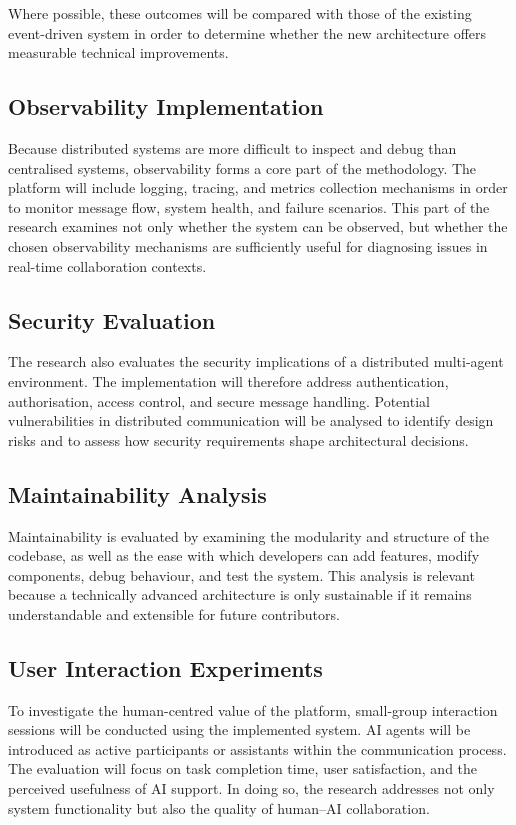 \documentclass[11pt]{article}
\begin{document}
Where possible, these outcomes will be compared with those of the existing event-driven system in order to determine whether the new architecture offers measurable technical improvements.

\subsection{Observability Implementation}

Because distributed systems are more difficult to inspect and debug than centralised systems, observability forms a core part of the methodology. The platform will include logging, tracing, and metrics collection mechanisms in order to monitor message flow, system health, and failure scenarios. This part of the research examines not only whether the system can be observed, but whether the chosen observability mechanisms are sufficiently useful for diagnosing issues in real-time collaboration contexts.

\subsection{Security Evaluation}

The research also evaluates the security implications of a distributed multi-agent environment. The implementation will therefore address authentication, authorisation, access control, and secure message handling. Potential vulnerabilities in distributed communication will be analysed to identify design risks and to assess how security requirements shape architectural decisions.

\subsection{Maintainability Analysis}

Maintainability is evaluated by examining the modularity and structure of the codebase, as well as the ease with which developers can add features, modify components, debug behaviour, and test the system. This analysis is relevant because a technically advanced architecture is only sustainable if it remains understandable and extensible for future contributors.

\subsection{User Interaction Experiments}

To investigate the human-centred value of the platform, small-group interaction sessions will be conducted using the implemented system. AI agents will be introduced as active participants or assistants within the communication process. The evaluation will focus on task completion time, user satisfaction, and the perceived usefulness of AI support. In doing so, the research addresses not only system functionality but also the quality of human--AI collaboration.
\end{document}
